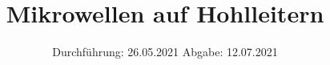 

\subject{V53}
\title{Mikrowellen auf Hohlleitern}
\date{%
  Durchführung: 26.05.2021
  \hspace{3em}
  Abgabe: 12.07.2021
}



\maketitle
\thispagestyle{empty}
\tableofcontents
\newpage








\printbibliography{}


